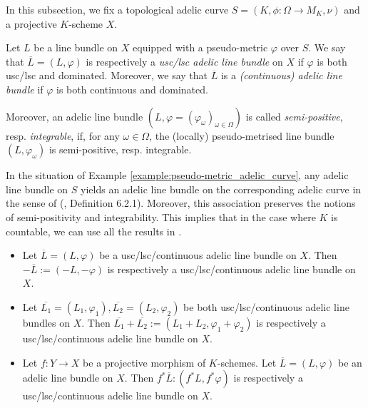 \documentclass [11pt,reqno]{amsart}
\newcommand{\1}{\mathmybb{1}}
\begin{document}
In this subsection, we fix a topological adelic curve $S=(K,\phi:\Omega\to M_K,\nu)$ and a projective $K$-scheme $X$. %

\begin{definition}
\label{def:adelic_line_bundles}
Let $L$ be a line bundle on $X$ equipped with a pseudo-metric $\varphi$ over $S$. We say that $\overline{L}=(L,\varphi)$ is respectively a \emph{usc/lsc adelic line bundle} on $X$ if $\varphi$ is both usc/lsc and dominated. Moreover, we say that $\overline{L}$ is a \emph{(continuous) adelic line bundle} if $\varphi$ is both continuous and dominated.

Moreover, an adelic line bundle $(L,\varphi=(\varphi_{\omega})_{\omega\in\Omega})$ is called \emph{semi-positive}, resp. \emph{integrable}, if, for any $\omega\in\Omega$, the (locally) pseudo-metrised line bundle $(L,\varphi_{\omega})$ is semi-positive, resp. integrable.
\end{definition}

\begin{remark}
\label{rem:adelic_line_bundles_adelic_curves}
In the situation of Example \ref{example:pseudo-metric_adelic_curve}, any adelic line bundle on $S$ yields an adelic line bundle on the corresponding adelic curve in the sense of (\cite{ChenMori}, Definition 6.2.1). Moreover, this association preserves the notions of semi-positivity and integrability. This implies that in the case where $K$ is countable, we can use all the results in \cite{ChenMori,ChenMori21,ChenMori24}. 
\end{remark}

\begin{proposition}
\label{prop:constructions_adelic_line_bundles}
\begin{itemize}
	\item[(1)] Let $\overline{L}=(L,\varphi)$ be a usc/lsc/continuous adelic line bundle on $X$. Then $-\overline{L}:=(-L,-\varphi)$ is respectively a usc/lsc/continuous adelic line bundle on $X$.
	\item[(2)] Let $\overline{L_1}=(L_1,\varphi_1),\overline{L_2}=(L_2,\varphi_2)$ be both usc/lsc/continuous adelic line bundles on $X$. Then $\overline{L_1}+\overline{L_2}:=(L_1+L_2,\varphi_1+\varphi_2)$ is respectively a usc/lsc/continuous adelic line bundle on $X$.
	\item[(3)] Let $f : Y \to X$ be a projective morphism of $K$-schemes. Let $\overline{L}=(L,\varphi)$ be an adelic line bundle on $X$. Then $f^{\ast}\overline{L}:(f^{\ast}L,f^{\ast}\varphi)$ is respectively a usc/lsc/continuous adelic line bundle on $X$.
\end{itemize}
\end{proposition}
\end{document}
